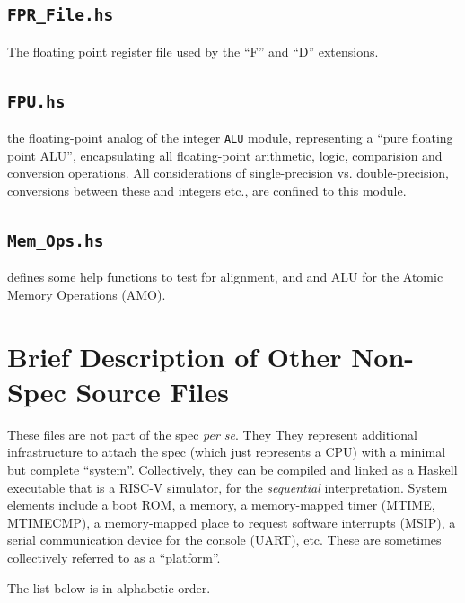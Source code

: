 \documentclass[11pt]{article}
\begin{document}

\subsection{\tt FPR\_File.hs}

The floating point register file used by the ``F'' and ``D'' extensions.


\subsection{\tt FPU.hs}

 the floating-point analog of the integer \verb|ALU|
module, representing a ``pure floating point ALU'', encapsulating all
floating-point arithmetic, logic, comparision and conversion
operations. All considerations of single-precision
vs. double-precision, conversions between these and integers etc., are
confined to this module.


\subsection{\tt Mem\_Ops.hs} defines some help functions to test for
alignment, and and ALU for the Atomic Memory Operations (AMO).


\section{Brief Description of Other Non-Spec Source Files}

These files are not part of the spec \emph{per se}.  They They
represent additional infrastructure to attach the spec (which just
represents a CPU) with a minimal but complete ``system''.
Collectively, they can be compiled and linked as a Haskell executable
that is a RISC-V simulator, for the \emph{sequential} interpretation.
System elements include a boot ROM, a memory, a memory-mapped timer
(MTIME, MTIMECMP), a memory-mapped place to request software
interrupts (MSIP), a serial communication device for the console
(UART), etc.  These are sometimes collectively referred to as a
``platform''.

The list below is in alphabetic order.

\end{document}
